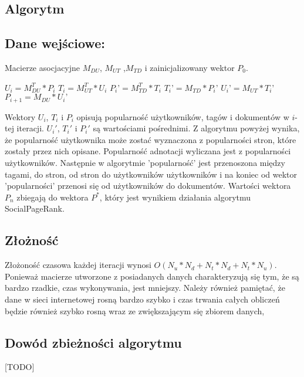 \subsection{Algorytm}
\subsection*{Dane wejściowe:}
Macierze asocjacyjne $M_{DU}$, $M_{UT}$ ,$M_{TD}$ i zainicjalizowany wektor $P_0$.
\begin{center}
\begin{algorithmic}
\REPEAT
\STATE $U_i = M_{DU}^T * P_i$
\STATE $T_i = M_{UT}^T * U_i$
\STATE $P_i’ = M_{TD}^T * T_i$
\STATE $T_i’ = M_{TD}  * P_i’$
\STATE $U_i’ = M_{UT} * T_i’$
\STATE $P_{i+1}= M_{DU} * U_i’$

\end{algorithmic}
\end{center}

Wektory $U_i$, $T_i$ i $P_i$ opisują popularność użytkowników, tagów i dokumentów w $i$-tej iteracji. $U_i'$, $T_i'$ i $P_i'$ są wartościami pośrednimi. Z algorytmu powyżej wynika, że popularność użytkownika może zostać wyznaczona z popularności stron, które zostały przez nich opisane.  Popularność adnotacji wyliczana jest z popularności użytkowników. Następnie w algorytmie 'popularność' jest przenoszona między tagami, do stron, od stron do użytkowników użytkowników i na koniec od wektor 'popularności' przenosi się od użytkowników do dokumentów. Wartości wektora $P_n$ zbiegają do wektora $P^*$, który jest wynikiem działania algorytmu SocialPageRank.


\subsection*{Złożność}
Złożoność czasowa każdej iteracji wynosi $O(N_u*N_d + N_t*N_d + N_t*N_u)$. Ponieważ macierze utworzone z posiadanych danych charakteryzują się tym, że są bardzo rzadkie, czas wykonywania, jest mniejszy. Należy również pamiętać, że dane w sieci internetowej rosną bardzo szybko i czas trwania całych obliczeń będzie również szybko rosną wraz ze zwiększającym się zbiorem danych,

\subsection*{Dowód zbieżności algorytmu}
[TODO]


















